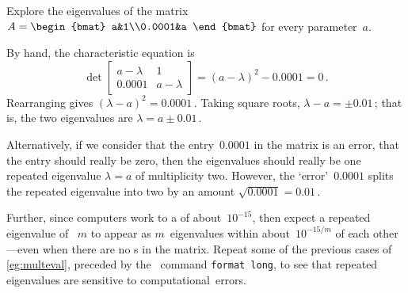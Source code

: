 \begin{example} 
Explore the eigenvalues of the matrix
\(A=\begin{bmat} a&1\\0.0001&a \end{bmat}\) for every parameter~\(a\).
\begin{solution} 
By hand, the characteristic equation is
\begin{equation*}
\det\begin{bmatrix} a-\lambda&1\\0.0001&a-\lambda \end{bmatrix}
=(a-\lambda)^2-0.0001=0\,.
\end{equation*}
Rearranging gives \((\lambda-a)^2=0.0001\)\,.
Taking square roots, \(\lambda-a=\pm0.01\)\,; that is, the two eigenvalues are \(\lambda=a\pm0.01\)\,.

Alternatively, if we consider that the entry~\(0.0001\) in the matrix is an error, that the entry should really be zero, then the eigenvalues should really be one repeated eigenvalue \(\lambda=a\) of multiplicity two.
However, the `error'~\(0.0001\) splits the repeated eigenvalue into two by an amount \(\sqrt{0.0001}=0.01\)\,.
\end{solution}
\end{example}


Further, since computers work to a  of about~\(10^{-15}\), then expect a repeated eigenvalue of ~\(m\) to appear as \(m\)~eigenvalues within about~\(10^{-15/m}\) of each other---even when there are no s in the matrix.
Repeat some of the previous cases of \autoref{eg:multeval}, preceded by the \script\ command \verb|format long|, to see that repeated eigenvalues are sensitive to computational~errors.



